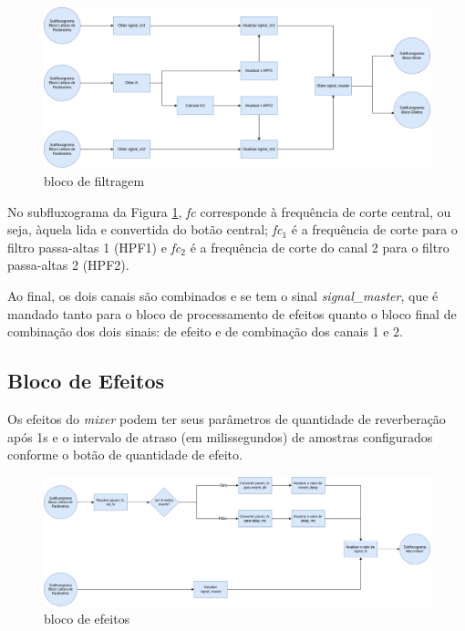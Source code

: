 \begin{figure}[h]
    \centering
    \includegraphics[width=\textwidth]{figuras/fig55.png}
    \caption{bloco de filtragem}
    \label{fig55}
\end{figure}

No subfluxograma da Figura \ref{fig55}, \textit{fc} corresponde à frequência de corte central, ou seja, àquela lida e convertida do botão central; \textit{fc$_{1}$} é a frequência de corte para o filtro passa-altas 1 (HPF1) e \textit{fc$_{2}$} é a frequência de corte do canal 2 para o filtro passa-altas 2 (HPF2).

Ao final, os dois canais são combinados e se tem o sinal \textit{signal\_master}, que é mandado tanto para o bloco de processamento de efeitos quanto o bloco final de combinação dos dois sinais: de efeito e de combinação dos canais 1 e 2.

\subsection{Bloco de Efeitos}

Os efeitos do \textit{mixer} podem ter seus parâmetros de quantidade de reverberação após 1s e o intervalo de atraso (em milissegundos) de amostras configurados conforme o botão de quantidade de efeito. 

\begin{figure}[h]
    \centering
    \includegraphics[width=\textwidth]{figuras/fig56.png}
    \caption{bloco de efeitos}
    \label{fig56}
\end{figure}

